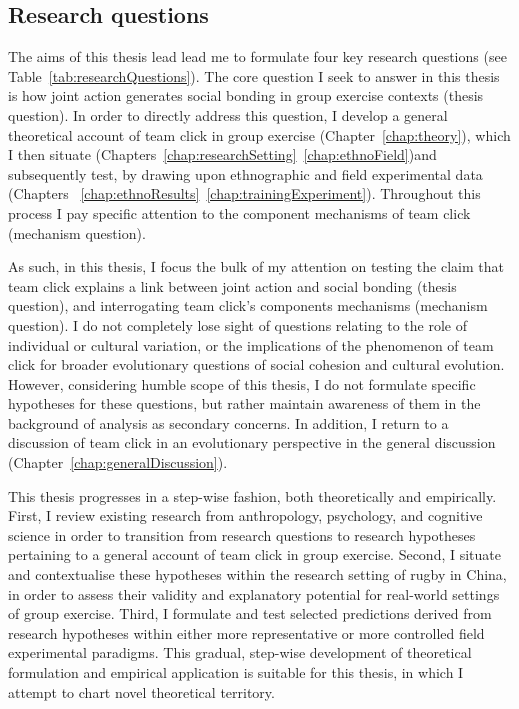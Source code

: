 \begin{CJK}{UTF8}{gbsn}
\subsection{Research questions\label{sect:researchQuestions}}
The aims of this thesis lead lead me to formulate four key research questions  (see Table~\ref{tab:researchQuestions}).  The core question I seek to answer in this thesis is how joint action generates social bonding in group exercise contexts (thesis question).  In order to directly address this question, I develop a general theoretical account of team click in group exercise (Chapter~\ref{chap:theory}), which I then situate (Chapters~\ref{chap:researchSetting}\nobreakdash~\ref{chap:ethnoField})and subsequently test, by drawing upon ethnographic and field experimental data (Chapters ~\ref{chap:ethnoResults}\nobreakdash~\ref{chap:trainingExperiment}).  Throughout this process I pay specific attention to the component mechanisms of team click (mechanism question).



As such, in this thesis, I focus the bulk of my attention on testing the claim that team click explains a link between joint action and social bonding (thesis question), and interrogating team click's components mechanisms (mechanism question).   I do not completely lose sight of questions relating to the role of individual or cultural variation, or the implications of the phenomenon of team click for broader evolutionary questions of social cohesion and cultural evolution.  However, considering humble scope of this thesis, I do not formulate specific hypotheses for these questions, but rather maintain awareness of them in the background of analysis as secondary concerns.  In addition, I return to a discussion of team click in an evolutionary perspective in the general discussion (Chapter~\ref{chap:generalDiscussion}).

This thesis progresses in a step-wise fashion, both theoretically and empirically.  First, I review existing research from anthropology, psychology, and cognitive science in order to transition from research questions to research hypotheses pertaining to a general account of team click in group exercise.  Second, I situate and contextualise these hypotheses within the research setting of rugby in China, in order to assess their validity and explanatory potential for real-world settings of group exercise.  Third, I formulate and test selected predictions derived from research hypotheses within either more representative or more controlled field experimental paradigms.
This gradual, step-wise development of theoretical formulation and empirical application is suitable for this thesis, in which I attempt to chart novel theoretical territory.



\end{CJK}
